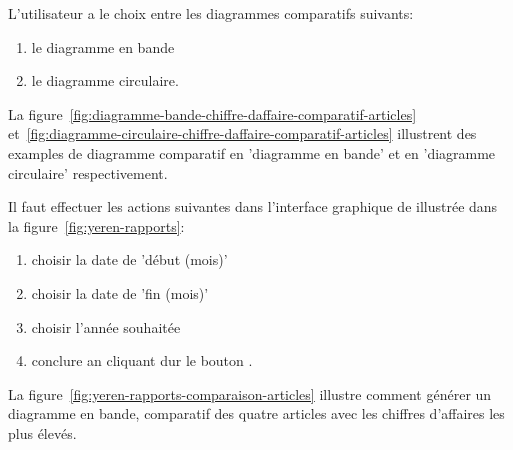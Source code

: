 L'utilisateur a le choix entre les diagrammes comparatifs
suivants:
\begin{enumerate}[1)]
	\item le diagramme en bande
	\item le diagramme circulaire.\\
\end{enumerate}

La figure~\ref{fig:diagramme-bande-chiffre-daffaire-comparatif-articles}
et~\ref{fig:diagramme-circulaire-chiffre-daffaire-comparatif-articles}
illustrent des examples de diagramme comparatif en 'diagramme en bande'
et en 'diagramme circulaire' respectivement.

\label{sec:evolution-chiffre-affaire}

Il faut effectuer les actions suivantes dans l'interface
graphique de \yeroth illustr\'ee dans la
figure~\ref{fig:yeren-rapports}:

\begin{enumerate}[1)]
	\item choisir la date de 'd\'ebut (mois)'
	\item choisir la date de 'fin (mois)'	
	\item choisir l'ann\'ee souhait\'ee
	\item conclure an cliquant dur le
		bouton .
\end{enumerate}

\newpage
{}\label{sec:comparaison-chiffre-affaire-articles}

La figure~\ref{fig:yeren-rapports-comparaison-articles}
illustre comment g\'en\'erer un diagramme en bande,
comparatif des quatre articles avec les chiffres d'affaires
les plus \'elev\'es.\\

